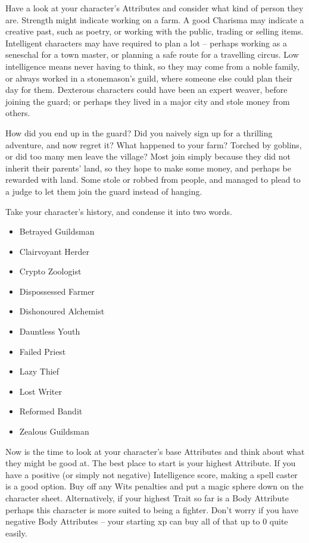 \begin{multicols}{2}
{{    Have a look at your character's Attributes and consider what kind of person they are.
    Strength might indicate working on a farm.
    A good Charisma may indicate a creative past, such as poetry, or working with the public, trading or selling items.
    Intelligent characters may have required to plan a lot -- perhaps working as a seneschal for a town master, or planning a safe route for a travelling circus.
    Low intelligence means never having to think, so they may come from a noble family, or always worked in a stonemason's guild, where someone else could plan their day for them.
    Dexterous characters could have been an expert weaver, before joining the \gls{guard}; or perhaps they lived in a major city and stole money from others.

    How did you end up in the \gls{guard}?
    Did you naively sign up for a thrilling adventure, and now regret it?
    What happened to your farm?
    Torched by goblins, or did too many men leave the village?
    Most join simply because they did not inherit their parents' land, so they hope to make some money, and perhaps be rewarded with land.
    Some stole or robbed from people, and managed to plead to a judge to let them join the \gls{guard} instead of hanging.

    Take your character's history, and condense it into two words.

    \begin{itemize}
      \item
      Betrayed Guildsman
      \item
      Clairvoyant Herder
      \item
      Crypto Zoologist
      \item
      Dispossessed Farmer
      \item
      Dishonoured Alchemist
      \item
      Dauntless Youth
      \item
      Failed Priest
      \item
      Lazy Thief
      \item
      Lost Writer
      \item
      Reformed Bandit
      \item
      Zealous Guildsman
    \end{itemize}
  }{
    Now is the time to look at your character's base Attributes and think about what they might be good at.
    The best place to start is your highest Attribute.
    If you have a positive (or simply not negative) Intelligence score, making a spell caster is a good option.
    Buy off any Wits penalties and put a magic sphere down on the character sheet.
    Alternatively, if your highest Trait so far is a Body Attribute perhaps this character is more suited to being a fighter.
    Don't worry if you have negative Body Attributes -- your starting \gls{xp} can buy all of that up to 0 quite easily.

}}
\end{multicols}
